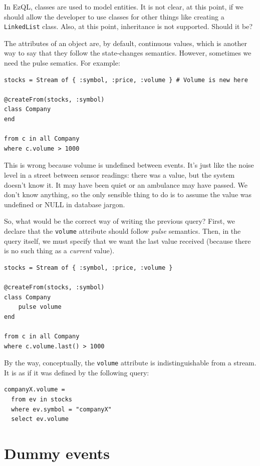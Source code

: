 \documentclass{report}
\begin{document}
In EzQL, classes are used to model entities. It is not clear, at this
point, if we should allow the developer to use classes for other
things like creating a \verb=LinkedList= class. Also, at this point,
inheritance is not supported. Should it be?

The attributes of an object are, by default, continuous values, which
is another way to say that they follow the state-changes
semantics. However, sometimes we need the pulse sematics. For example:


\begin{verbatim}
stocks = Stream of { :symbol, :price, :volume } # Volume is new here

@createFrom(stocks, :symbol)
class Company
end

from c in all Company
where c.volume > 1000
\end{verbatim}

This is wrong because volume is undefined between events. It's just
like the noise level in a street between sensor readings: there was a
value, but the system doesn't know it. It may have been quiet or an
ambulance may have passed. We don't know anything, so the only
sensible thing to do is to assume the value was undefined or NULL in
database jargon.

So, what would be the correct way of writing the previous query?
First, we declare that the \verb=volume= attribute should follow
\emph{pulse} semantics. Then, in the query itself, we must specify
that we want the last value received (because there is no such thing
as a \emph{current} value).

\begin{verbatim}
stocks = Stream of { :symbol, :price, :volume }

@createFrom(stocks, :symbol)
class Company
    pulse volume
end

from c in all Company
where c.volume.last() > 1000
\end{verbatim}

By the way, conceptually, the \verb=volume= attribute is
indistinguishable from a stream. It is as if it was defined by the
following query:

\begin{verbatim}
companyX.volume =
  from ev in stocks
  where ev.symbol = "companyX"
  select ev.volume
\end{verbatim}

\section{Dummy events}
\end{document}
